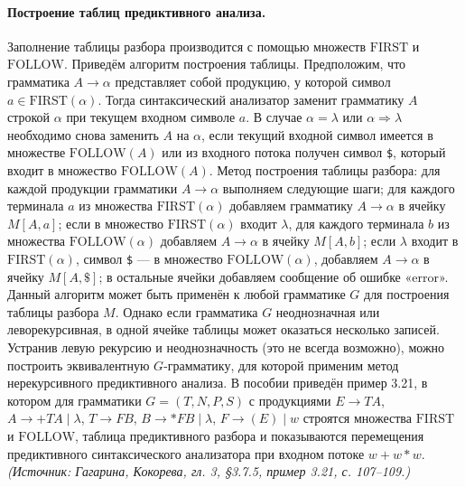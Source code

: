 \documentclass[a4paper,12pt]{article}
\begin{document}
\paragraph{Построение таблиц предиктивного анализа.}
Заполнение таблицы разбора производится с помощью множеств \(\mathrm{FIRST}\) и \(\mathrm{FOLLOW}\). Приведём алгоритм построения таблицы. Предположим, что грамматика \(A\to\alpha\) представляет собой продукцию, у которой символ \(a\in\mathrm{FIRST}(\alpha)\). Тогда синтаксический анализатор заменит грамматику \(A\) строкой \(\alpha\) при текущем входном символе \(a\). В случае \(\alpha=\lambda\) или \(\alpha\Rightarrow\lambda\) необходимо снова заменить \(A\) на \(\alpha\), если текущий входной символ имеется в множестве \(\mathrm{FOLLOW}(A)\) или из входного потока получен символ \texttt{\$}, который входит в множество \(\mathrm{FOLLOW}(A)\). Метод построения таблицы разбора: для каждой продукции грамматики \(A\to\alpha\) выполняем следующие шаги; для каждого терминала \(a\) из множества \(\mathrm{FIRST}(\alpha)\) добавляем грамматику \(A\to\alpha\) в ячейку \(M[A,a]\); если в множество \(\mathrm{FIRST}(\alpha)\) входит \(\lambda\), для каждого терминала \(b\) из множества \(\mathrm{FOLLOW}(\alpha)\) добавляем \(A\to\alpha\) в ячейку \(M[A,b]\); если \(\lambda\) входит в \(\mathrm{FIRST}(\alpha)\), символ \texttt{\$} — в множество \(\mathrm{FOLLOW}(\alpha)\), добавляем \(A\to\alpha\) в ячейку \(M[A,\texttt{\$}]\); в остальные ячейки добавляем сообщение об ошибке «error». Данный алгоритм может быть применён к любой грамматике \(G\) для построения таблицы разбора \(M\). Однако если грамматика \(G\) неоднозначная или леворекурсивная, в одной ячейке таблицы может оказаться несколько записей. Устранив левую рекурсию и неоднозначность (это не всегда возможно), можно построить эквивалентную \(G\)-грамматику, для которой применим метод нерекурсивного предиктивного анализа. В пособии приведён пример 3.21, в котором для грамматики \(G=(T,N,P,S)\) с продукциями \(E\to TA\), \(A\to+TA\mid\lambda\), \(T\to FB\), \(B\to*FB\mid\lambda\), \(F\to(E)\mid w\) строятся множества \(\mathrm{FIRST}\) и \(\mathrm{FOLLOW}\), таблица предиктивного разбора и показываются перемещения предиктивного синтаксического анализатора при входном потоке \(w+w*w\).
\textit{(Источник: Гагарина, Кокорева, гл. 3, §3.7.5, пример 3.21, с. 107--109.)}
\end{document}

